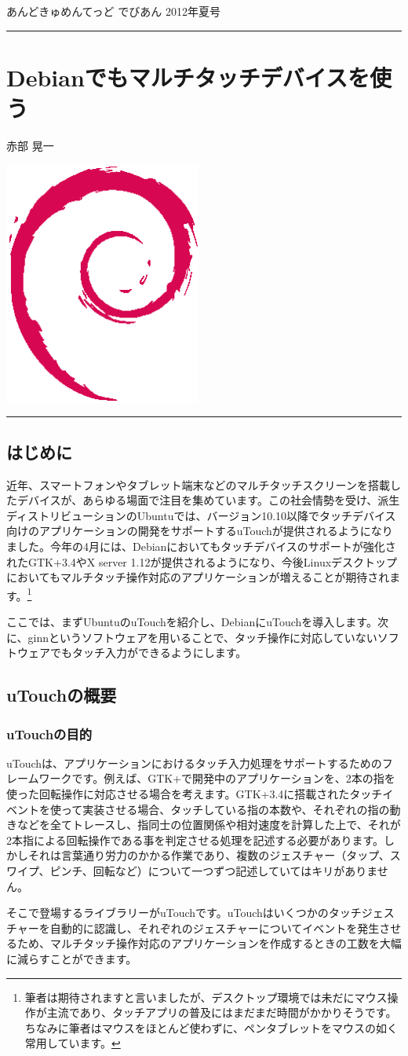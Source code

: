 \documentclass[mingoth,a4paper]{jsarticle}
\renewcommand{\dancersection}[2]{%
\newpage
あんどきゅめんてっど でびあん 2012年夏号
%
\vspace{0.1mm}\\
{\color{dancerdarkblue}\rule{\hsize}{2mm}}

%
%
\begin{minipage}[t]{0.6\hsize}
\color{dancerdarkblue}
\vspace{1cm}
\section{#1}
\hfill{}#2\\
\end{minipage}
\begin{minipage}[t]{0.4\hsize}
\vspace{-2cm}
\hfill{}\includegraphics[height=8cm]{image200502/openlogo-nd.eps}\\
\vspace{-5cm}
\end{minipage}
%
{\color{dancerlightblue}\rule{0.66\hsize}{2mm}}
%
\vspace{2cm}
}
\begin{document}
\dancersection{Debianでもマルチタッチデバイスを使う}{赤部 晃一}
\label{sec:multitouch}

\subsection{はじめに}

近年、スマートフォンやタブレット端末などのマルチタッチスクリーンを搭載したデバイスが、あらゆる場面で注目を集めています。この社会情勢を受け、派生ディストリビューションのUbuntuでは、バージョン10.10以降でタッチデバイス向けのアプリケーションの開発をサポートするuTouchが提供されるようになりました。今年の4月には、Debianにおいてもタッチデバイスのサポートが強化されたGTK+3.4やX server 1.12が提供されるようになり、今後Linuxデスクトップにおいてもマルチタッチ操作対応のアプリケーションが増えることが期待されます。\footnote{筆者は期待されますと言いましたが、デスクトップ環境では未だにマウス操作が主流であり、タッチアプリの普及にはまだまだ時間がかかりそうです。ちなみに筆者はマウスをほとんど使わずに、ペンタブレットをマウスの如く常用しています。}

ここでは、まずUbuntuのuTouchを紹介し、DebianにuTouchを導入します。次に、ginnというソフトウェアを用いることで、タッチ操作に対応していないソフトウェアでもタッチ入力ができるようにします。

\subsection{uTouchの概要}

\subsubsection{uTouchの目的}

uTouchは、アプリケーションにおけるタッチ入力処理をサポートするためのフレームワークです。例えば、GTK+で開発中のアプリケーションを、2本の指を使った回転操作に対応させる場合を考えます。GTK+3.4に搭載されたタッチイベントを使って実装させる場合、タッチしている指の本数や、それぞれの指の動きなどを全てトレースし、指同士の位置関係や相対速度を計算した上で、それが2本指による回転操作である事を判定させる処理を記述する必要があります。しかしそれは言葉通り労力のかかる作業であり、複数のジェスチャー（タップ、スワイプ、ピンチ、回転など）について一つずつ記述していてはキリがありません。

そこで登場するライブラリーがuTouchです。uTouchはいくつかのタッチジェスチャーを自動的に認識し、それぞれのジェスチャーについてイベントを発生させるため、マルチタッチ操作対応のアプリケーションを作成するときの工数を大幅に減らすことができます。
\end{document}
